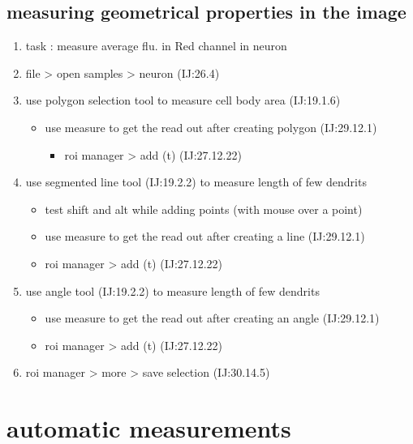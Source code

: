 \documentclass[11pt]{article}
\begin{document}
\subsection{measuring geometrical properties in the image}
\label{sec-5-2}
\begin{enumerate}
\item task : measure average flu. in Red channel in neuron
\item file > open samples > neuron (IJ:26.4)
\item use polygon selection tool to measure cell body area (IJ:19.1.6)
\begin{itemize}
\item use measure to get the read out after creating polygon (IJ:29.12.1)
\begin{itemize}
\item roi manager > add (t) (IJ:27.12.22)
\end{itemize}
\end{itemize}
\item use segmented line tool (IJ:19.2.2) to measure length of few
dendrits
\begin{itemize}
\item test shift and alt while adding points (with mouse over a point)
\item use measure to get the read out after creating a line
(IJ:29.12.1)
\item roi manager > add (t) (IJ:27.12.22)
\end{itemize}
\item use angle tool (IJ:19.2.2) to measure length of few dendrits
\begin{itemize}
\item use measure to get the read out after creating an angle (IJ:29.12.1)
\item roi manager > add (t) (IJ:27.12.22)
\end{itemize}
\item roi manager > more > save selection (IJ:30.14.5)
\end{enumerate}

\section{automatic measurements}
\label{sec-6}
\end{document}
